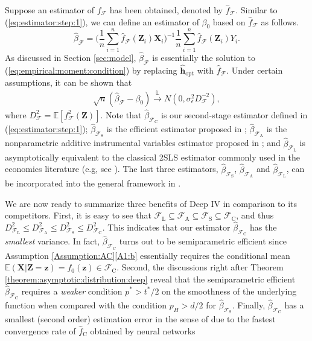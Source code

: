 \documentclass[11pt, preprint]{imsart}
\numberwithin{equation}{section}
\def \mcF{\mathcal{F}}
\def \bfX{\mathbf{X}}
\def \bfZ{\mathbf{Z}}
\def \bfz{\mathbf{z}}
\def \bfh{\mathbf{h}}
\def \ev{\mathbb{E}}
\def \cid{\xrightarrow[\text{}]{\text{$\mathbb{L}$}}}
\theoremstyle{plain}
\theoremstyle{definition}
\begin{document}
Suppose an estimator of  $f_\mcF$ has been obtained, denoted by $\widehat{f}_\mcF$. 
Similar to (\ref{eq:estimator:step:1}), we can define an estimator of $\beta_0$ based on $\widehat{f}_\mcF$ as follows.
\begin{equation}\label{eq:general:beta:mcF}
	\widehat{\beta}_{\mcF}=\bigg(\frac{1}{n}\sum_{i=1}^n\widehat{f}_\mcF(\bfZ_i) \bfX_i\bigg)^{-1}\frac{1}{n}\sum_{i=1}^n\widehat{f}_\mcF(\bfZ_i) Y_i.
\end{equation}
As discussed in Section \ref{sec:model}, $\widehat{\beta}_{\mcF}$ is essentially the solution to (\ref{eq:empirical:moment:condition}) by replacing $\widehat{\bfh}_\textrm{opt}$ with $\widehat{f}_{\mcF}$. Under certain assumptions, it can be shown that
\begin{eqnarray}
	\sqrt{n}(\widehat{\beta}_{\mcF}-\beta_0)\cid N(0, \sigma_\epsilon^2D_\mcF^{-2}),\label{eq:general:beta:asymptotic}
\end{eqnarray}
where $D_\mcF^2=\ev[f_\mcF^2(\bfZ)]$. Note that $\widehat{\beta}_{\mcF_{\textrm{C}}}$ is our second-stage estimator defined in  (\ref{eq:estimator:step:1}); $\widehat{\beta}_{\mcF_{\textrm{S}}}$ is the efficient estimator proposed in \cite{n90};
$\widehat{\beta}_{\mcF_{\textrm{A}}}$  is the nonparametric additive instrumental variables estimator proposed
in \cite{fz18}; and $\widehat{\beta}_{\mcF_{\textrm{L}}}$ is asymptotically equivalent to the classical 2SLS estimator commonly used in the economics literature (e.g, see \citealp{ak91}). The last three estimators, $\widehat{\beta}_{\mcF_{\textrm{S}}}$, $\widehat{\beta}_{\mcF_{\textrm{A}}}$ and $\widehat{\beta}_{\mcF_{\textrm{L}}}$, can be incorporated into the general  framework in \cite{bcch12}. 

{We are now ready to summarize three benefits of Deep IV in comparison to its competitors. First, it is easy to see that $\mcF_{\textrm{L}}\subseteq \mcF_{\textrm{A}} \subseteq \mcF_{\textrm{S}} \subseteq \mcF_{\textrm{C}}$, and thus $D_{\mcF_\textrm{L}}^2\leq D_{\mcF_\textrm{A}}^2\leq D_{\mcF_\textrm{S}}^2\leq D_{\mcF_\textrm{C}}^2$. This indicates that our estimator $\widehat{\beta}_{\mcF_{\textrm{C}}}$ has the {\em smallest} variance. In fact, $\widehat{\beta}_{\mcF_\textrm{C}}$ turns out to be semiparametric efficient since Assumption \ref{Assumption:AC}\ref{A1:b} essentially requires the conditional mean $\ev(\bfX | \bfZ=\bfz)=f_0(\bfz)\in \mcF_\textrm{C}$. Second, the discussions right after Theorem \ref{theorem:asymptotic:distribution:deep} reveal that the semiparametric efficient  $\widehat{\beta}_{\mcF_{\textrm{C}}}$ requires a {\em weaker} condition $p^*>t^*/2$ on the smoothness of the underlying function when compared with the condition $p_H>d/2$ for $\widehat{\beta}_{\mcF_{\textrm{S}}}$. Finally, $\widehat{\beta}_{\mcF_{\textrm{C}}}$ has a smallest (second order) estimation error in the sense of \cite{cheng2008general} due to the fastest convergence rate of $\widehat{f}_{\textrm{C}}$ obtained by neural networks}
\end{document}
